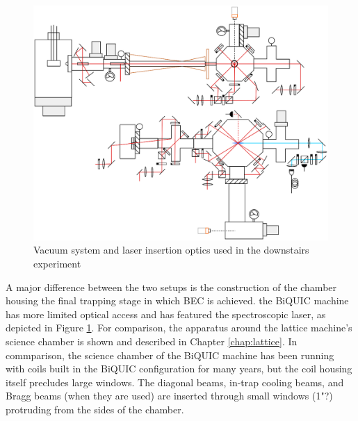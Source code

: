	\begin{figure}
		\centering
		\includegraphics[width=\textwidth]{fig/apparatus/vacuum_schematic}
		\caption{Vacuum system and laser insertion optics used in the downstairs experiment }
		\label{fig:vacuum_diagram}
	\end{figure}
	


	A major difference between the two setups is the construction of the chamber housing the final trapping stage in which BEC is achieved.
	the BiQUIC machine has more limited optical access and has featured the spectroscopic laser, as depicted in Figure \ref{fig:vacuum_diagram}.
	For comparison, the apparatus around the lattice machine's science chamber is shown and described in Chapter \ref{chap:lattice}.
	In commparison, the science chamber of the BiQUIC machine has been running with coils built in the BiQUIC configuration for many years, but the coil housing itself precludes large windows.
	The diagonal beams, in-trap cooling beams, and Bragg beams (when they are used) are inserted through small windows (1"?) protruding from the sides of the chamber.



